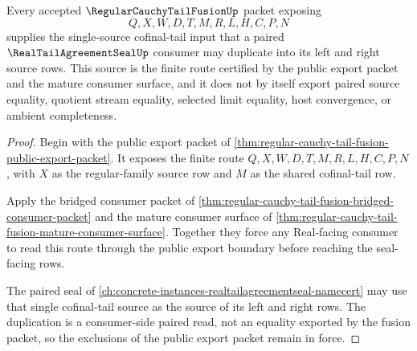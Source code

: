 \begin{theorem}
\label{thm:regular-cauchy-tail-fusion-paired-agreement-source}
Every accepted $\RegularCauchyTailFusionUp$ packet exposing
$$
Q,X,W,D,T,M,R,L,H,C,P,N
$$
supplies the single-source cofinal-tail input that a paired $\RealTailAgreementSealUp$ consumer may duplicate into its left and right source rows. This source is the finite route certified by the public export packet and the mature consumer surface, and it does not by itself export paired source equality, quotient stream equality, selected limit equality, host convergence, or ambient completeness.
\end{theorem}
\begin{proof}
Begin with the public export packet of \autoref{thm:regular-cauchy-tail-fusion-public-export-packet}. It exposes the finite route $Q,X,W,D,T,M,R,L,H,C,P,N$, with $X$ as the regular-family source row and $M$ as the shared cofinal-tail row.

Apply the bridged consumer packet of \autoref{thm:regular-cauchy-tail-fusion-bridged-consumer-packet} and the mature consumer surface of \autoref{thm:regular-cauchy-tail-fusion-mature-consumer-surface}. Together they force any Real-facing consumer to read this route through the public export boundary before reaching the seal-facing rows.

The paired seal of \autoref{ch:concrete-instances-realtailagreementseal-namecert} may use that single cofinal-tail source as the source of its left and right rows. The duplication is a consumer-side paired read, not an equality exported by the fusion packet, so the exclusions of the public export packet remain in force.
\end{proof}

